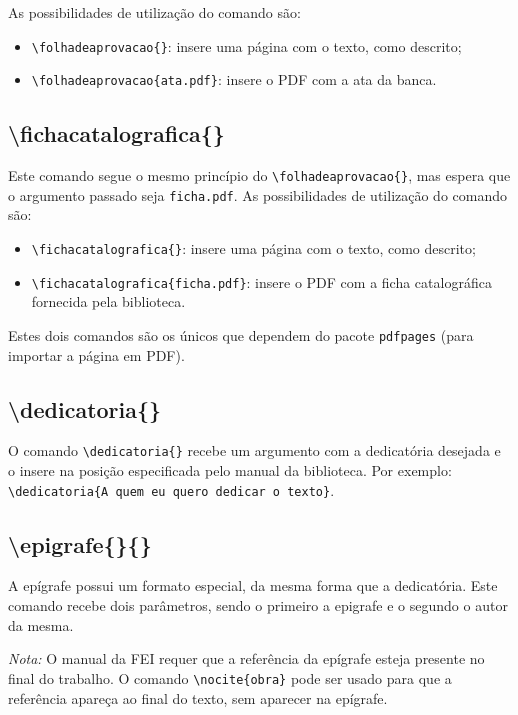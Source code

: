 \documentclass{fei}
\begin{document}
    As possibilidades de utilização do comando são:
    \begin{itemize}
        \item \verb+\folhadeaprovacao{}+: insere uma página com o texto, como descrito;
        \item \verb+\folhadeaprovacao{ata.pdf}+: insere o PDF com a ata da banca.
    \end{itemize}
    
    
    \subsection{\textbackslash fichacatalografica\{\}}
    Este comando segue o mesmo princípio do \verb+\folhadeaprovacao{}+, mas espera que o argumento passado seja \texttt{ficha.pdf}. As possibilidades de utilização do comando são:
    \begin{itemize}
        \item \verb+\fichacatalografica{}+: insere uma página com o texto, como descrito;
        \item \verb+\fichacatalografica{ficha.pdf}+: insere o PDF com a ficha catalográfica fornecida pela biblioteca.
    \end{itemize}
 
 Estes dois comandos são os únicos que dependem do pacote \texttt{pdfpages} (para importar a página em PDF).

    \subsection{\textbackslash dedicatoria\{\}}
    O comando \verb+\dedicatoria{}+ recebe um argumento com a dedicatória desejada e o insere na posição especificada pelo manual da biblioteca. Por exemplo: \\ \verb+\dedicatoria{A quem eu quero dedicar o texto}+.
    
    \subsection{\textbackslash epigrafe\{\}\{\}}
    A epígrafe possui um formato especial, da mesma forma que a dedicatória. Este comando recebe dois parâmetros, sendo o primeiro a epigrafe e o segundo o autor da mesma.
    
    \emph{Nota:} O manual da FEI requer que a referência da epígrafe esteja presente no final do trabalho. O comando \verb+\nocite{obra}+ pode ser usado para que a referência apareça ao final do texto, sem aparecer na epígrafe.
    
\end{document}

